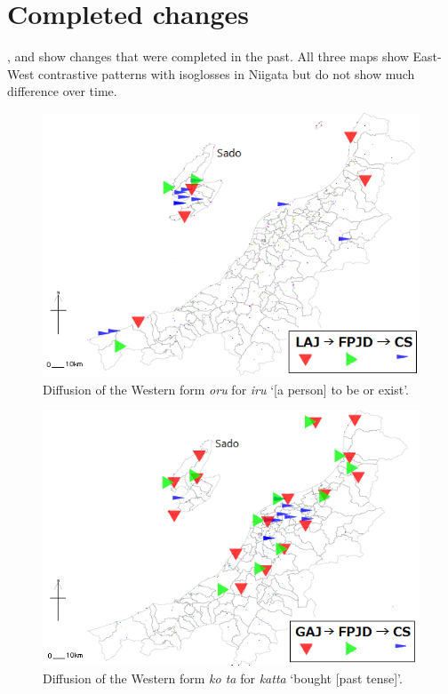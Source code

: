 \documentclass[output=paper]{LSP/langsci}
\begin{document}
\section{Completed changes}

,  and  show changes that were completed in the past.  All three maps show East-West contrastive patterns with isoglosses in Niigata but do not show much difference over time.

\begin{figure}
\includegraphics[width=.75\textwidth]{illustrations/fuku2_fig2a}
\caption{Diffusion of the Western form \textit{oru} for \textit{iru} `[a person] to be or exist'.}
\label{fig:2a}
\end{figure}

\begin{figure}
\includegraphics[width=.75\textwidth]{illustrations/fuku2_fig2b}
\caption{Diffusion of the Western form \textit{ko
ta} for \textit{katta} `bought [past tense]'.}
\label{fig:2b}
\end{figure}
\end{document}
